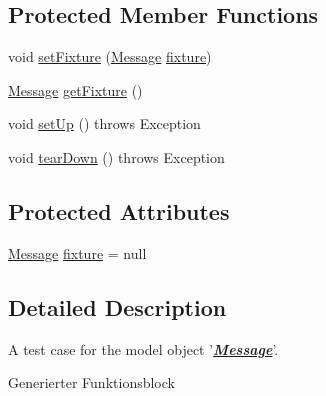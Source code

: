 \subsection*{Protected Member Functions}
\begin{DoxyCompactItemize}
\item 
void \hyperlink{classshootingmachineemfmodel_1_1tests_1_1_message_test_acbe621ee2b426ad5b998b2f17f76cf1f}{set\-Fixture} (\hyperlink{interfaceshootingmachineemfmodel_1_1_message}{Message} \hyperlink{classshootingmachineemfmodel_1_1tests_1_1_message_test_ae766ce61aedf47ee7183b0f96cc839fa}{fixture})
\item 
\hyperlink{interfaceshootingmachineemfmodel_1_1_message}{Message} \hyperlink{classshootingmachineemfmodel_1_1tests_1_1_message_test_a6de31489f5cd4997e9f1e48f4ec165ee}{get\-Fixture} ()
\item 
void \hyperlink{classshootingmachineemfmodel_1_1tests_1_1_message_test_a4b525efb8928c520b1521a3a39794176}{set\-Up} ()  throws Exception 
\item 
void \hyperlink{classshootingmachineemfmodel_1_1tests_1_1_message_test_a5eadc06ce9c2a81d1e9616a5d8c6b4cc}{tear\-Down} ()  throws Exception 
\end{DoxyCompactItemize}
\subsection*{Protected Attributes}
\begin{DoxyCompactItemize}
\item 
\hyperlink{interfaceshootingmachineemfmodel_1_1_message}{Message} \hyperlink{classshootingmachineemfmodel_1_1tests_1_1_message_test_ae766ce61aedf47ee7183b0f96cc839fa}{fixture} = null
\end{DoxyCompactItemize}


\subsection{Detailed Description}
A test case for the model object '{\itshape {\bfseries \hyperlink{interfaceshootingmachineemfmodel_1_1_message}{Message}}}'.

Generierter Funktionsblock 

